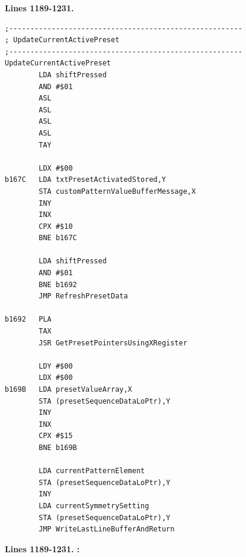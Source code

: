\clearpage
\textbf{Lines 1189-1231. } 
\begin{lstlisting}
;-------------------------------------------------------
; UpdateCurrentActivePreset
;-------------------------------------------------------
UpdateCurrentActivePreset    
        LDA shiftPressed
        AND #$01
        ASL 
        ASL 
        ASL 
        ASL 
        TAY 

        LDX #$00
b167C   LDA txtPresetActivatedStored,Y
        STA customPatternValueBufferMessage,X
        INY 
        INX 
        CPX #$10
        BNE b167C

        LDA shiftPressed
        AND #$01
        BNE b1692
        JMP RefreshPresetData

b1692   PLA 
        TAX 
        JSR GetPresetPointersUsingXRegister

        LDY #$00
        LDX #$00
b169B   LDA presetValueArray,X
        STA (presetSequenceDataLoPtr),Y
        INY 
        INX 
        CPX #$15
        BNE b169B

        LDA currentPatternElement
        STA (presetSequenceDataLoPtr),Y
        INY 
        LDA currentSymmetrySetting
        STA (presetSequenceDataLoPtr),Y
        JMP WriteLastLineBufferAndReturn
\end{lstlisting}
\clearpage

\textbf{Lines 1189-1231. :} 
\clearpage

